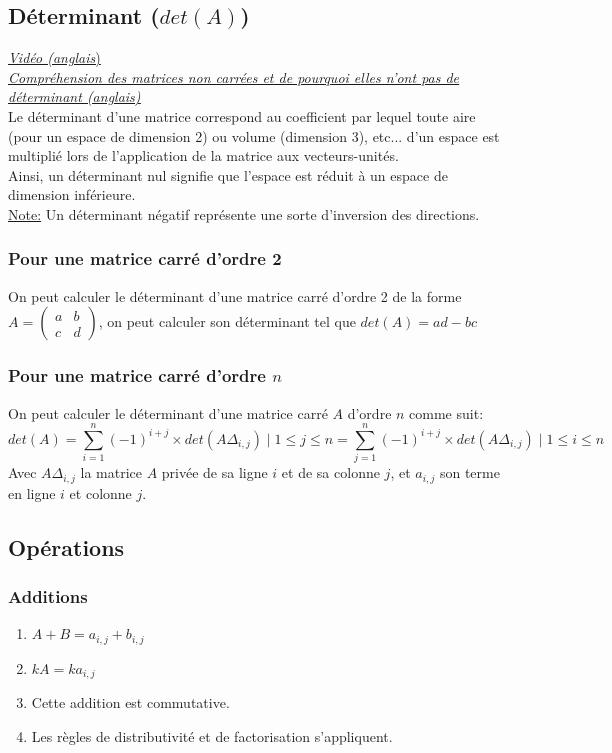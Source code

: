 \documentclass{article}
\begin{document}
\subsection{Déterminant ($det(A)$)}
\href{https://youtu.be/Ip3X9LOh2dk}{\underline{\textit{Vidéo (anglais})}}\\
\href{https://youtu.be/v8VSDg_WQlA}{\underline{\textit{Compréhension des matrices non carrées et de pourquoi elles n'ont pas de déterminant (anglais)}}}\\
\break
Le déterminant d'une matrice correspond au coefficient par lequel toute aire (pour un espace de dimension 2) ou volume (dimension 3), etc... d'un espace est multiplié lors de l'application de la matrice aux vecteurs-unités.\\
Ainsi, un déterminant nul signifie que l'espace est réduit à un espace de dimension inférieure.\\
\underline{Note:} Un déterminant négatif représente une sorte d'inversion des directions.
\subsubsection{Pour une matrice carré d'ordre 2}
On peut calculer le déterminant d'une matrice carré d'ordre 2 de la forme
$ A = \begin{pmatrix}
a & b \\
c & d
\end{pmatrix}$, on peut calculer son déterminant tel que $det(A)=ad-bc$
\subsubsection{Pour une matrice carré d'ordre $n$}
On peut calculer le déterminant d'une matrice carré $A$ d'ordre $n$ comme suit:
$$det(A) = \sum_{i=1}^n (-1)^{i+j} \times det(A\Delta_{i,j}) \mid 1\le j \le n = \sum_{j=1}^n (-1)^{i+j} \times det(A\Delta_{i,j}) \mid 1\le i \le n$$
Avec $A\Delta_{i,j}$ la matrice $A$ privée de sa ligne $i$ et de sa colonne $j$, et $a_{i,j}$ son terme en ligne $i$ et colonne $j$.

\subsection{Opérations}
\subsubsection{Additions}
\begin{enumerate}
	\item $A+B = a_{i,j}+b_{i,j}$
	\item $kA = ka_{i,j}$
	\item Cette addition est commutative.
	\item Les règles de distributivité et de factorisation s'appliquent.
\end{enumerate}
\hfill \break
\end{document}

